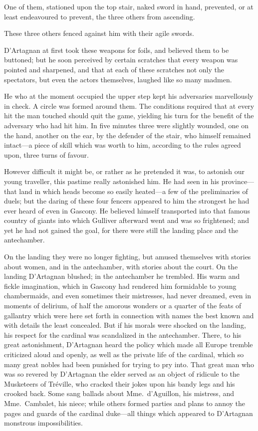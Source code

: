 One of them, stationed upon the top stair, naked sword in hand, prevented, or at least endeavoured to prevent, the three others from ascending. 

These three others fenced against him with their agile swords. 

D'Artagnan at first took these weapons for foils, and believed them to be buttoned; but he soon perceived by certain scratches that every weapon was pointed and sharpened, and that at each of these scratches not only the spectators, but even the actors themselves, laughed like so many madmen. 

He who at the moment occupied the upper step kept his adversaries marvellously in check. A circle was formed around them. The conditions required that at every hit the man touched should quit the game, yielding his turn for the benefit of the adversary who had hit him. In five minutes three were slightly wounded, one on the hand, another on the ear, by the defender of the stair, who himself remained intact—a piece of skill which was worth to him, according to the rules agreed upon, three turns of favour. 

However difficult it might be, or rather as he pretended it was, to astonish our young traveller, this pastime really astonished him. He had seen in his province—that land in which heads become so easily heated—a few of the preliminaries of duels; but the daring of these four fencers appeared to him the strongest he had ever heard of even in Gascony. He believed himself transported into that famous country of giants into which Gulliver afterward went and was so frightened; and yet he had not gained the goal, for there were still the landing place and the antechamber. 

On the landing they were no longer fighting, but amused themselves with stories about women, and in the antechamber, with stories about the court. On the landing D'Artagnan blushed; in the antechamber he trembled. His warm and fickle imagination, which in Gascony had rendered him formidable to young chambermaids, and even sometimes their mistresses, had never dreamed, even in moments of delirium, of half the amorous wonders or a quarter of the feats of gallantry which were here set forth in connection with names the best known and with details the least concealed. But if his morals were shocked on the landing, his respect for the cardinal was scandalized in the antechamber. There, to his great astonishment, D'Artagnan heard the policy which made all Europe tremble criticized aloud and openly, as well as the private life of the cardinal, which so many great nobles had been punished for trying to pry into. That great man who was so revered by D'Artagnan the elder served as an object of ridicule to the Musketeers of Tréville, who cracked their jokes upon his bandy legs and his crooked back. Some sang ballads about Mme.~d'Aguillon, his mistress, and Mme.~Cambalet, his niece; while others formed parties and plans to annoy the pages and guards of the cardinal duke—all things which appeared to D'Artagnan monstrous impossibilities. 

